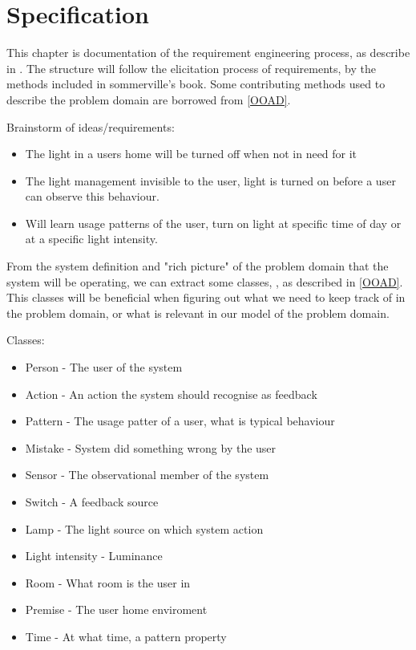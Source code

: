 \chapter{Specification}

This chapter is documentation of the requirement engineering process, as describe in \cite{sommerville}. The structure will follow the elicitation process of requirements, by the methods included in sommerville's book. Some contributing methods used to describe the problem domain are borrowed from \cref{OOAD}. 

Brainstorm of ideas/requirements:
\begin{itemize}
\item The light in a users home will be turned off when not in need for it
\item The light management invisible to the user, light is turned on before a user can observe this behaviour.
\item Will learn usage patterns of the user, turn on light at specific time of day or at a specific light intensity.
\end{itemize}

From the system definition and "rich picture" of the problem domain that the system will be operating, we can extract some classes, , as described in \cref{OOAD}. This classes will be beneficial when figuring out what we need to keep track of in the problem domain, or what is relevant in our model of the problem domain.

Classes:
\begin{itemize}
\item Person - The user of the system
\item Action - An action the system should recognise as feedback
\item Pattern - The usage patter of a user, what is typical behaviour
\item Mistake - System did something wrong by the user
\item Sensor - The observational member of the system
\item Switch - A feedback source
\item Lamp - The light source on which system action
\item Light intensity - Luminance
\item Room - What room is the user in
\item Premise - The user home enviroment
\item Time - At what time, a pattern property
\end{itemize}

